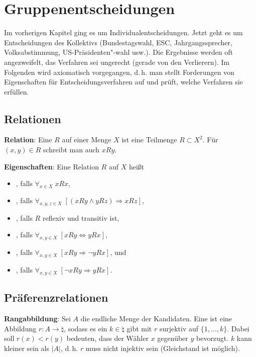 \section{%
    Gruppenentscheidungen%
}

Im vorherigen Kapitel ging es um Individualentscheidungen.
Jetzt geht es um Entscheidungen des Kollektivs
(Bundestagswahl, ESC, Jahrgangssprecher, Volksabstimmung, US-Präsidenten"-wahl usw.).
Die Ergebnisse werden oft angezweifelt, das Verfahren sei ungerecht
(gerade von den Verlierern).
Im Folgenden wird axiomatisch vorgegangen, d.\,h. man stellt Forderungen von Eigenschaften für
Entscheidungsverfahren auf und prüft, welche Verfahren sie erfüllen.

\subsection{%
    Relationen%
}

\textbf{Relation}:
Eine  $R$ auf einer Menge $X$ ist eine Teilmenge $R \subset X^2$.
Für $(x, y) \in R$ schreibt man auch $xRy$.

\textbf{Eigenschaften}:
Eine Relation $R$ auf $X$ heißt
\begin{itemize}
    \item
    , falls $\forall_{x \in X}\; xRx$,

    \item
    , falls $\forall_{x, y, z \in X}\; [(xRy \land yRz) \Rightarrow xRz]$,

    \item
    , falls $R$ reflexiv und transitiv ist,

    \item
    , falls
    $\forall_{x, y \in X}\; [xRy \Leftrightarrow yRx]$,

    \item
    , falls
    $\forall_{x, y \in X}\; [xRy \Rightarrow \lnot yRx]$, und

    \item
    , falls
    $\forall_{x, y \in X}\; [\lnot xRy \Rightarrow yRx]$.
\end{itemize}

\subsection{%
    Präferenzrelationen%
}

\textbf{Rangabbildung}:
Sei $A$ die endliche Menge der Kandidaten.
Eine  ist eine Abbildung $r\colon A \to \natural$,
sodass es ein $k \in \natural$ gibt mit $r$ surjektiv auf $\{1, \dotsc, k\}$.
Dabei soll $r(x) < r(y)$ bedeuten, dass der Wähler $x$ gegenüber $y$ bevorzugt.
$k$ kann kleiner sein als $|A|$, d.\,h. $r$ muss nicht injektiv sein
(Gleichstand ist möglich).

